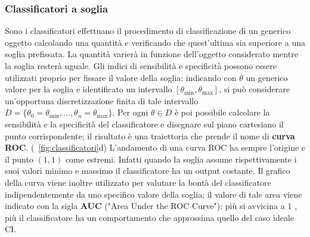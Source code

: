 \subsubsection{Classificatori a soglia}
Sono i classificatori effettuano il procedimento di classificazione di un generico oggetto calcolando una quantità e verificando che quest'ultima sia superiore a una soglia prefissata. La quantità varierà in funzione dell'oggetto considerato mentre la soglia resterà uguale. Gli indici di sensibilità e specificità possono essere utilizzati proprio per fissare il valore della soglia: indicando con $\theta$ un generico valore per la soglia e identificato un intervallo $[\theta_{\text{min}}, \theta_{\text{max}}]$, si può considerare un'opportuna discretizzazione finita di tale intervallo $D = \{\theta_0 = \theta_{\text{min}}, ..., \theta_n = \theta_{\text{max}}\}$. Per ogni $\theta \in D$ è poi possibile calcolare la sensibilità e la specificità del classificatore e disegnare sul piano cartesiano il punto corrispondente; il risultato è una traiettoria che prende il nome di \textbf{curva ROC}. (\figurename \ \ref{fig:classificatori}d) L'andamento di una curva ROC ha sempre l'origine e il punto $(1, 1)$ come estremi. Infatti quando la soglia assume rispettivamente i suoi valori minimo e massimo il classificatore ha un output costante. Il grafico della curva viene inoltre utilizzato per valutare la bontà del classificatore indipendentemente da uno specifico valore della soglia; il valore di tale area viene indicato con la sigla \textbf{AUC} ("Area Under the ROC Curve"): più si avvicina a $1$ , più il classificatore ha un comportamento che approssima quello del caso ideale CI.

